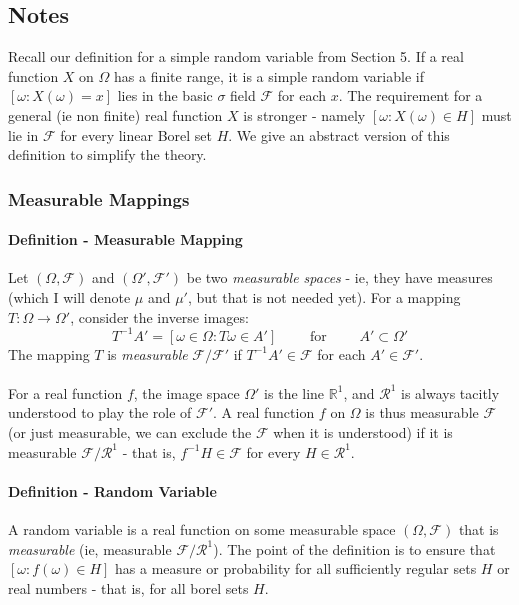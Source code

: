 \documentclass[12pt,a4paper]{article}
\newcommand{\1}[1]{\mathbbm{1}\left\{ #1 \right\}}
\newcommand{\R}{\mathbb{R}}
\newcommand{\fcal}{\mathcal{F}}
\newcommand{\rcal}{\mathcal{R}}
\begin{document}
\subsection{Notes}
Recall our definition for a simple random variable from Section 5. If a real function $X$ on $\Omega$ has a finite range, it is a simple random variable if $[\omega : X(\omega) = x]$ lies in the basic $\sigma$ field $\fcal$ for each $x$. The requirement for a general (ie non finite) real function $X$ is stronger - namely $[\omega : X(\omega) \in H]$ must lie in $\fcal$ for every linear Borel set $H$. We give an abstract version of this definition to simplify the theory.

\subsubsection{Measurable Mappings}
\paragraph{Definition - Measurable Mapping} Let $(\Omega,\fcal)$ and $(\Omega',\fcal')$ be two \textit{measurable spaces} - ie, they have measures (which I will denote $\mu$ and $\mu'$, but that is not needed yet). For a mapping $T: \Omega \to \Omega'$, consider the inverse images:
$$
	T^{-1}A' = \left[\omega \in \Omega : T\omega \in A'\right] \quad\quad\text{ for }\quad\quad A' \subset \Omega'
$$
The mapping $T$ is \textit{measurable} $\fcal/\fcal'$ if $T^{-1}A' \in \fcal$ for each $A' \in \fcal'$.
\\\\
For a real function $f$, the image space $\Omega'$ is the line $\R^1$, and $\rcal^1$ is always tacitly understood to play the role of $\fcal'$. A real function $f$ on $\Omega$ is thus measurable $\fcal$ (or just measurable, we can exclude the $\fcal$ when it is understood) if it is measurable $\fcal/\rcal^1$ - that is, $f^{-1}H \in \fcal$ for every $H \in \rcal^1$.

\paragraph{Definition - Random Variable} A random variable is a real function on some measurable space $(\Omega,\fcal)$ that is \textit{measurable} (ie, measurable $\fcal/\rcal^1$). The point of the definition is to ensure that $[\omega : f(\omega) \in H]$ has a measure or probability for all sufficiently regular sets $H$ or real numbers - that is, for all borel sets $H$.
\end{document}
